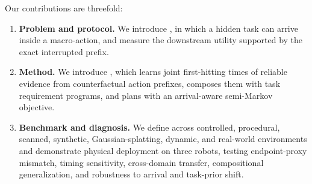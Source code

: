 Our contributions are threefold:
\begin{enumerate}[leftmargin=*,itemsep=2pt,topsep=3pt]
  \item \textbf{Problem and protocol.}
  We introduce \taskname{}, in which a hidden task can arrive inside a macro-action, and measure the downstream utility supported by the exact interrupted prefix.
  \item \textbf{Method.}
  We introduce \method{}, which learns joint first-hitting times of reliable evidence from counterfactual action prefixes, composes them with task requirement programs, and plans with an arrival-aware semi-Markov objective.
  \item \textbf{Benchmark and diagnosis.}
  We define \bench{} across controlled, procedural, scanned, synthetic, Gaussian-splatting, dynamic, and real-world environments and demonstrate physical deployment on three robots, testing endpoint-proxy mismatch, timing sensitivity, cross-domain transfer, compositional generalization, and robustness to arrival and task-prior shift.
\end{enumerate}
